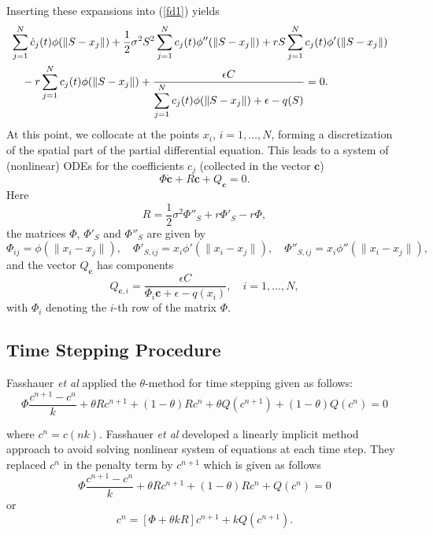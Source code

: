 \documentclass[12pt]{article}
\numberwithin{equation}{subsection} %
\begin{document}
Inserting these expansions into (\ref{fd1}) yields
\begin{eqnarray*}
& \displaystyle \sum_{j=1}^N \dot{c}_j(t) \phi(\|S-x_j\|) +
\frac{1}{2}\sigma^2 S^2 \sum_{j=1}^N c_j(t) \phi''(\|S-x_j\|) +
rS\sum_{j=1}^N c_j(t) \phi'(\|S-x_j\|)& \cr & \displaystyle \quad -
r \sum_{j=1}^N c_j(t) \phi(\|S-x_j\|) +\frac{\epsilon
C}{\displaystyle \sum_{j=1}^N c_j(t) \phi(\|S-x_j\|) + \epsilon -
q(S)}= 0.&
\end{eqnarray*}
At this point, we collocate at the points $x_i$, $i=1,\ldots,N$,
forming a discretization of the spatial part of the partial
differential equation. This leads to a system of (nonlinear) ODEs
for the coefficients $c_j$ (collected in the vector $\textbf{c}$)
\begin{equation}\label{ode}
\Phi \dot{\textbf{c}} + R \textbf{c} + Q_{\textbf{c}} = 0.
\end{equation}
Here
$$
R = \frac{1}{2} \sigma^2 \Phi''_S + r \Phi'_S - r \Phi,
$$
the matrices $\Phi$, $\Phi'_S$ and $\Phi''_S$ are given by
$$
\Phi_{ij} = \phi(\|x_i-x_j\|), \quad \Phi'_{S,ij} =
x_i\phi'(\|x_i-x_j\|), \quad \Phi''_{S,ij} = x_i\phi''(\|x_i-x_j\|),
$$
and the vector $Q_{\textbf{c}}$ has components
$$
Q_{\textbf{c},i} =\frac{\epsilon C}{\Phi_i \textbf{c} + \epsilon -
q(x_i)}, \quad i=1,\ldots,N,
$$
with $\Phi_i$ denoting the $i$-th row of the matrix $\Phi$.

\subsection{Time Stepping Procedure}

    Fasshauer \textit{et al} \cite{Fas02} applied the $\theta$-method for time  stepping given  as
    follows:
    \begin{equation*}\label{t1}
    \Phi\frac{c^{n+1}-c^n}{k}+\theta Rc^{n+1}+(1-\theta)Rc^n
    +\theta Q(c^{n+1})+(1-\theta)Q(c^n)=0
\end{equation*}


where $c^n=c(nk)$. Fasshauer \textit{et al} \cite{Fas02} developed a
linearly implicit method approach to avoid solving nonlinear system
of equations at each time step. They replaced $c^n$ in the penalty
term by $c^{n+1}$ which is given as follows
 \begin{equation*}
    \Phi\frac{c^{n+1}-c^n}{k}+\theta Rc^{n+1}+(1-\theta)Rc^n
    + Q(c^n)=0
\end{equation*}
or
\begin{equation*}
   [\Phi-(1-\theta)kR]c^{n}=[\Phi + \theta kR]c^{n+1}+kQ(c^{n+1}).
\end{equation*}
\end{document}
